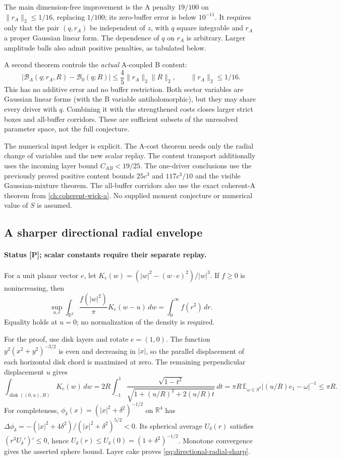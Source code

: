 The main dimension-free improvement is the A penalty $19/100$ on
$\|r_A\|_2\le1/16$, replacing $1/100$; its zero-buffer error is below
$10^{-11}$. It requires only that the pair $(q,r_A)$ be independent of
$z$, with $q$ square integrable and $r_A$ a proper Gaussian linear form.
The dependence of $q$ on $r_A$ is arbitrary. Larger amplitude balls
also admit positive penalties, as tabulated below.

A second theorem controls the \emph{actual} A-coupled B content:
\[
 |\mathcal B_A(q;r_A,R)-\mathcal B_0(q;R)|
 \le\frac45\|r_A\|_2\|R\|_2,\qquad \|r_A\|_2\le1/16.
\]
This has no additive error and no buffer restriction. Both sector
variables are Gaussian linear forms (with the B variable antiholomorphic),
but they may share every driver with $q$.
Combining it with the strengthened costs closes larger strict boxes and
all-buffer corridors. These are sufficient subsets of the unresolved
parameter space, not the full conjecture.

The numerical input ledger is explicit. The A-cost theorem needs only
the radial change of variables and the new scalar replay. The content
transport additionally uses the incoming layer bound $C_{AB}<19/25$.
The one-driver conclusions use the previously proved positive content
bounds $25c^3$ and $117c^3/10$ and the visible Gaussian-mixture theorem.
The all-buffer corridors also use the exact coherent-A theorem from
\autoref{ch:coherent-wick-a}. No supplied moment conjecture or numerical value of $S$ is
assumed.

\subsection{A sharper directional radial envelope}
\paragraph{Status [P]; scalar constants require their separate replay.}
For a unit planar vector $e$, let
$K_e(w)=(|w|^2-(w\cdot e)^2)/|w|^3$.
If $f\ge0$ is nonincreasing, then
\begin{equation}
 \boxed{\sup_{u,e}\int_{\mathbb R^2}
 \frac{f(|w|^2)}{\pi}K_e(w-u)\,dw
 =\int_0^\infty f(r^2)\,dr.}
 \label{eq:directional-radial-sharp}
\end{equation}
Equality holds at $u=0$; no normalization of the density is required.

For the proof, use disk layers and rotate $e=(1,0)$.
The function $y^2(x^2+y^2)^{-3/2}$ is even and decreasing in $|x|$,
so the parallel displacement of each horizontal disk chord is maximized
at zero. The remaining perpendicular displacement $u$ gives
\[
 \int_{\operatorname{disk}((0,u),R)}K_e(w)\,dw
 =2R\int_{-1}^1
 \frac{\sqrt{1-t^2}}{\sqrt{1+(u/R)^2+2(u/R)t}}\,dt
 =\pi R\,\mathbb E_{\omega\in S^3}|(u/R)e_1-\omega|^{-1}
 \le\pi R.
\]
For completeness, $\phi_\delta(x)=(|x|^2+\delta^2)^{-1/2}$ on
$\mathbb R^4$ has
$\Delta\phi_\delta=-(|x|^2+4\delta^2)/(|x|^2+\delta^2)^{5/2}<0$.
Its spherical average $U_\delta(r)$ satisfies
$(r^3U_\delta')'\le0$, hence
$U_\delta(r)\le U_\delta(0)=(1+\delta^2)^{-1/2}$.
Monotone convergence gives the asserted sphere bound. Layer cake
proves \eqref{eq:directional-radial-sharp}.

